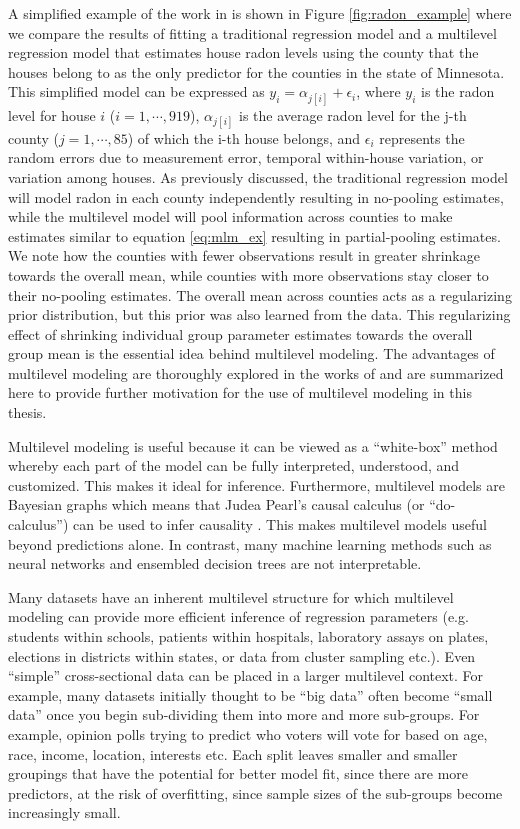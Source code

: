A simplified example of the work in \cite{Gelman2006b} is shown in Figure \ref{fig:radon_example} where we compare the results of fitting a traditional regression model and a multilevel regression model that estimates house radon levels using the county that the houses belong to as the only predictor for the counties in the state of Minnesota. This simplified model can be expressed as $y_i = \alpha_{j[i]} + \epsilon_i$, where $y_i$ is the radon level for house $i$ ($i=1, \cdots ,919$), $\alpha_{j[i]}$ is the average radon level for the j-th county ($j=1, \cdots ,85$) of which the i-th house belongs, and $\epsilon_i$ represents the random errors due to measurement error, temporal within-house variation, or variation among houses. As previously discussed, the traditional regression model will model radon in each county independently resulting in no-pooling estimates, while the multilevel model will pool information across counties to make estimates similar to equation \ref{eq:mlm_ex} resulting in partial-pooling estimates. We note how the counties with fewer observations result in greater shrinkage towards the overall mean, while counties with more observations stay closer to their no-pooling estimates. The overall mean across counties acts as a regularizing prior distribution, but this prior was also learned from the data. This regularizing effect of shrinking individual group parameter estimates towards the overall group mean is the essential idea behind multilevel modeling. The advantages of multilevel modeling are thoroughly explored in the works of \cite{Gelman2014} \cite{Gelman2006} \cite{McElreath2020} and are summarized here to provide further motivation for the use of multilevel modeling in this thesis.

Multilevel modeling is useful because it can be viewed as a ``white-box'' method whereby each part of the model can be fully interpreted, understood, and customized. This makes it ideal for inference. Furthermore, multilevel models are Bayesian graphs which means that Judea Pearl’s causal calculus (or ``do-calculus'') can be used to infer causality \cite{Pearl2000}. This makes multilevel models useful beyond predictions alone. In contrast, many machine learning methods such as neural networks and ensembled decision trees are not interpretable.

Many datasets have an inherent multilevel structure for which multilevel modeling can provide more efficient inference of regression parameters (e.g. students within schools, patients within hospitals, laboratory assays on plates, elections in districts within states, or data from cluster sampling etc.). Even ``simple'' cross-sectional data can be placed in a larger multilevel context. For example, many datasets initially thought to be ``big data'' often become ``small data'' once you begin sub-dividing them into more and more sub-groups. For example, opinion polls trying to predict who voters will vote for based on age, race, income, location, interests etc. Each split leaves smaller and smaller groupings that have the potential for better model fit, since there are more predictors, at the risk of overfitting, since sample sizes of the sub-groups become increasingly small.

